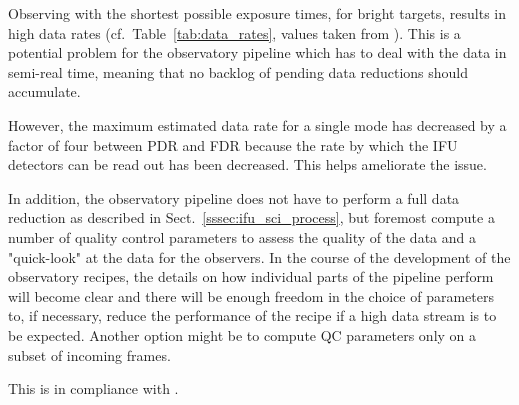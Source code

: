 Observing with the shortest possible exposure times, for bright targets,
results in high data rates (cf.~Table~\ref{tab:data_rates}, values taken from
\cite{METIS-data_rates}). This is a potential problem for the observatory
pipeline which has to deal with the data in semi-real time, meaning that no
backlog of pending data reductions should accumulate.

However, the maximum estimated data rate for a single mode has decreased by a
factor of four between PDR and FDR because the rate by which the IFU detectors
can be read out has been decreased. This helps ameliorate the issue. 

In addition, the observatory pipeline does not have to perform a full data reduction
as described in Sect.~\ref{sssec:ifu_sci_process}, but foremost compute a number
of quality control parameters to assess the quality of the data and a
"quick-look" at the data for the observers. In the course of the development of
the observatory recipes, the details on how individual parts of the pipeline
perform will become clear and there will be enough freedom in the choice of
parameters to, if necessary, reduce the performance of the recipe if a high data
stream is to be expected. Another option might be to compute QC parameters only
on a subset of incoming frames.


This is in compliance with .



